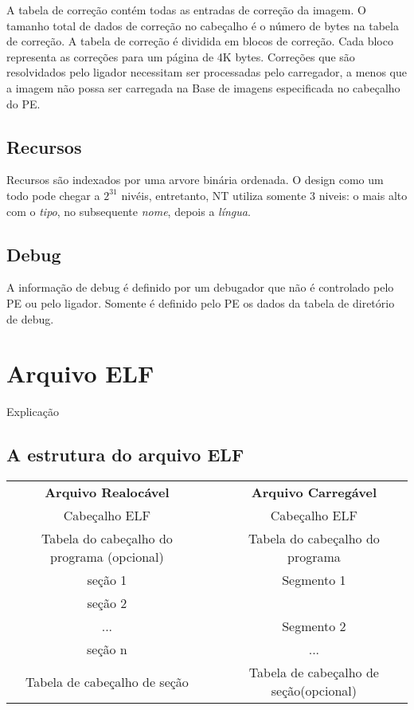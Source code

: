 A tabela de correção contém todas as entradas de correção da imagem.
O tamanho total de dados de correção no cabeçalho é o número de bytes
na tabela de correção. A tabela de correção é dividida em blocos de
correção. Cada bloco representa as correções para um página de 4K
bytes. Correções que são resolvidados pelo ligador necessitam ser
processadas pelo carregador, a menos que a imagem não possa ser carregada
na Base de imagens especificada no cabeçalho do PE.


\subsection{Recursos}


Recursos são indexados por uma arvore binária ordenada. O design
como um todo pode chegar a $2^{31}$ nivéis, entretanto, NT utiliza
somente 3 niveis: o mais alto com o \emph{tipo}, no subsequente \emph{nome},
depois a \emph{língua}.


\subsection{Debug}


A informação de debug é definido por um debugador que não é controlado
pelo PE ou pelo ligador. Somente é definido pelo PE os dados da tabela
de diretório de debug.


\section{Arquivo ELF}

Explicação


\subsection{A estrutura do arquivo ELF}

\begin{tabular}{|c|c|c|}
\multicolumn{1}{c}{\textbf{Arquivo Realocável}} & \multicolumn{1}{c}{} & \multicolumn{1}{c}{\textbf{Arquivo Carregável}}\tabularnewline
\cline{1-1} \cline{3-3} 
Cabeçalho ELF &  & Cabeçalho ELF\tabularnewline
\cline{1-1} \cline{3-3} 
Tabela do cabeçalho do programa (opcional) &  & Tabela do cabeçalho do programa\tabularnewline
\cline{1-1} \cline{3-3} 
seção 1 &  & Segmento 1\tabularnewline
\cline{1-1} 
seção 2 &  & \tabularnewline
\cline{1-1} \cline{3-3} 
... &  & Segmento 2\tabularnewline
\cline{1-1} \cline{3-3} 
seção n &  & ...\tabularnewline
\cline{1-1} \cline{3-3} 
Tabela de cabeçalho de seção &  & Tabela de cabeçalho de seção(opcional)\tabularnewline
\cline{1-1} \cline{3-3} 
\end{tabular}

